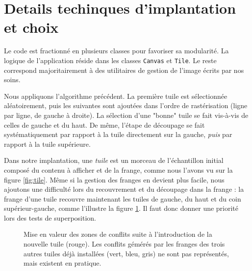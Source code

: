 \documentclass{article}
\begin{document}

%

\section{Details techinques d'implantation et choix}

\label{sec:tech}
Le code est fractionné en plusieurs classes pour favoriser sa modularité. La logique de l'application réside dans les classes \texttt{Canvas} et \texttt{Tile}. Le reste correspond majoritairement à des utilitaires de gestion de l'image écrits par nos soins. 

Nous appliquons l'algorithme précédent. La première tuile est sélectionnée aléatoirement, puis les suivantes sont ajoutées dans l'ordre de rastérisation (ligne par ligne, de gauche à droite). La sélection d'une "bonne" tuile se fait vis-à-vis de celles de gauche et du haut. De même, l'étape de découpage se fait systématiquement par rapport à la tuile directement sur la gauche, \emph{puis} par rapport à la tuile supérieure. %

Dans notre implantation, une \emph{tuile} est un morceau de l'échantillon initial composé du contenu à afficher et de la frange, comme nous l'avons vu sur la figure \ref{fig:tile}. Même si la gestion des franges en devient plus facile, nous ajoutons une difficulté lors du recouvrement et du découpage dans la frange : la frange d'une tuile recouvre maintenant les tuiles de gauche, du haut et du coin supérieur-gauche, comme l'illustre la figure \ref{fig:conflict}. Il faut donc donner une priorité lors des tests de superposition. 

\begin{figure}
    \centering
    \scalebox{1.2}{}
	\caption{Mise en valeur des zones de conflits suite à l'introduction de la nouvelle tuile (rouge). Les conflits gémérés par les franges des trois autres tuiles déjà installées (vert, bleu, gris) ne sont pas représentés, mais existent en pratique.\label{fig:conflict}}
\end{figure}
\end{document}
